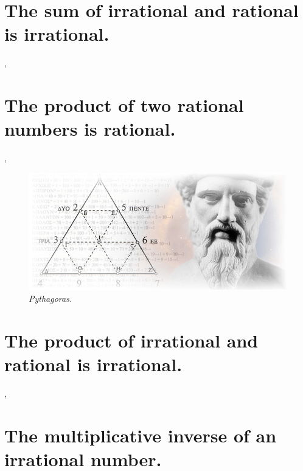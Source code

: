\documentclass[preview]{standalone}
\begin{document}
\section{The sum of irrational and rational is irrational.}

\sep


\section{The product of two rational numbers is rational.}

\sep
\begin{figure}[h!]
    \centering
    \includegraphics[width=13cm]{../resources/jpg/1.6.introduction.to.proofs/pythagoras.jpg}
    \caption*{\emph{Pythagoras.}}
\end{figure}
\pagebreak


\section{The product of irrational and rational is irrational.}

\sep
\vspace{0.1\baselineskip}


\section{The multiplicative inverse of an irrational number.}

\pagebreak
\end{document}
